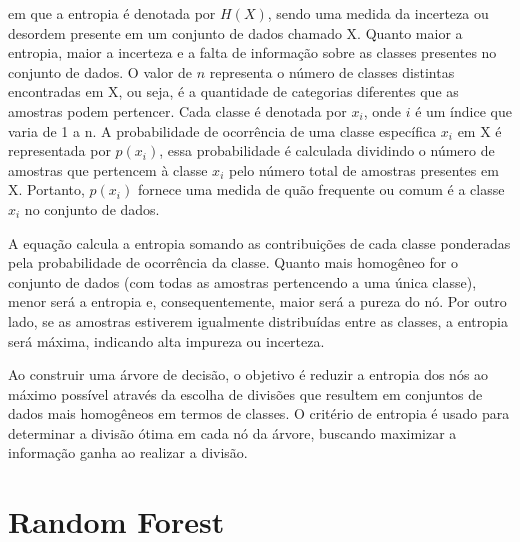 \documentclass[12pt,oneside,a4paper,chapter=TITLE,
			   english,brazil]{abntex2}
\begin{document}
\noindent em que a entropia é denotada por $H(X)$, sendo uma medida da incerteza ou desordem presente em um conjunto de dados chamado X. Quanto maior a entropia, maior a incerteza e a falta de informação sobre as classes presentes no conjunto de dados. O valor de $n$ representa o número de classes distintas encontradas em X, ou seja, é a quantidade de categorias diferentes que as amostras podem pertencer. Cada classe é denotada por $x_i$, onde $i$ é um índice que varia de 1 a n. A probabilidade de ocorrência de uma classe específica $x_i$ em X é representada por $p(x_i)$, essa probabilidade é calculada dividindo o número de amostras que pertencem à classe $x_i$ pelo número total de amostras presentes em X. Portanto, $p(x_i)$ fornece uma medida de quão frequente ou comum é a classe $x_i$ no conjunto de dados.




A equação calcula a entropia somando as contribuições de cada classe ponderadas pela probabilidade de ocorrência da classe. Quanto mais homogêneo for o conjunto de dados (com todas as amostras pertencendo a uma única classe), menor será a entropia e, consequentemente, maior será a pureza do nó. Por outro lado, se as amostras estiverem igualmente distribuídas entre as classes, a entropia será máxima, indicando alta impureza ou incerteza. 

Ao construir uma árvore de decisão, o objetivo é reduzir a entropia dos nós ao máximo possível através da escolha de divisões que resultem em conjuntos de dados mais homogêneos em termos de classes. O critério de entropia é usado para determinar a divisão ótima em cada nó da árvore, buscando maximizar a informação ganha ao realizar a divisão.



\vspace{\onelineskip}

\section{Random Forest}
\end{document}
